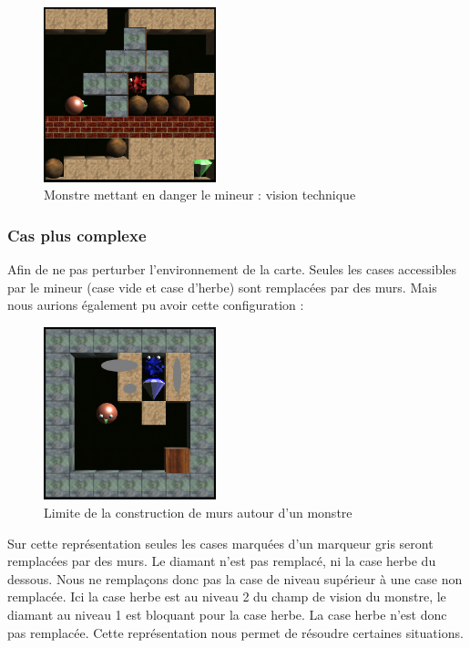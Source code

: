 \documentclass[a4paper,11pt]{article}
\begin{document}
		\begin{figure}[h]
			\center
			\includegraphics[width=5cm]{monstre2}
			\caption{\label{monstre2} Monstre mettant en danger le mineur : vision technique }
		\end{figure}
		
		\subsubsection{Cas plus complexe}
		
Afin de ne pas perturber l’environnement de la carte. Seules les cases accessibles par le mineur (case vide et case d’herbe) sont remplacées par des murs.
Mais nous aurions également pu avoir cette configuration :
	
		\begin{figure}[h]
			\center
			\includegraphics[width=5cm]{situation1}
			\caption{\label{monstre3} Limite de la construction de murs autour d'un monstre }
		\end{figure}
		
Sur cette représentation seules les cases marquées d’un marqueur gris seront remplacées par des murs. Le diamant n’est pas remplacé, ni la case herbe du dessous. Nous ne remplaçons donc pas la case de niveau supérieur à une case non remplacée. Ici la case herbe est au niveau 2 du champ de vision du monstre, le diamant au niveau 1 est bloquant pour la case herbe. La case herbe n’est donc pas remplacée.
Cette représentation nous permet de résoudre certaines situations.
	
\end{document}
